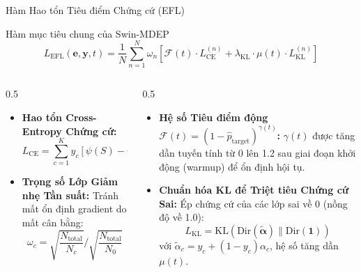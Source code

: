 \documentclass[aspectratio=169, 10pt]{beamer}
\begin{document}
\begin{frame}{Hàm Hao tổn Tiêu điểm Chứng cứ (EFL)}
  \begin{block}{Hàm mục tiêu chung của Swin-MDEP}
    $$L_{\text{EFL}}(\bm{e}, \bm{y}, t) = \frac{1}{N} \sum_{n=1}^N \omega_n \left[ \mathcal{F}(t) \cdot L_{\text{CE}}^{(n)} + \lambda_{\text{KL}} \cdot \mu(t) \cdot L_{\text{KL}}^{(n)} \right]$$
  \end{block}
  \begin{columns}
    \begin{column}{0.5\textwidth}
      \begin{itemize}
        \item \textbf{Hao tổn Cross-Entropy Chứng cứ:}
        $$L_{\text{CE}} = \sum_{c=1}^K y_c \left[ \psi(S) - \psi(\alpha_c) \right]$$
        \item \textbf{Trọng số Lớp Giảm nhẹ Tần suất:}
        Tránh mất ổn định gradient do mất cân bằng:
        $$\omega_c = \sqrt{\frac{N_{\text{total}}}{N_c}} \Big/ \sqrt{\frac{N_{\text{total}}}{N_0}}$$
      \end{itemize}
    \end{column}
    \begin{column}{0.5\textwidth}
      \begin{itemize}
        \item \textbf{Hệ số Tiêu điểm động $\mathcal{F}(t) = (1 - \hat{p}_{\text{target}})^{\gamma(t)}$:}
        $\gamma(t)$ được tăng dần tuyến tính từ 0 lên 1.2 sau giai đoạn khởi động (warmup) để ổn định hội tụ.
        \item \textbf{Chuẩn hóa KL để Triệt tiêu Chứng cứ Sai:}
        Ép chứng cứ của các lớp sai về 0 (nồng độ về 1.0):
        $$L_{\text{KL}} = \text{KL}(\text{Dir}(\tilde{\bm{\alpha}}) \parallel \text{Dir}(\bm{1}))$$
        với $\tilde{\alpha}_c = y_c + (1-y_c)\alpha_c$, hệ số tăng dần $\mu(t)$.
      \end{itemize}
    \end{column}
  \end{columns}
\end{frame}
\end{document}
